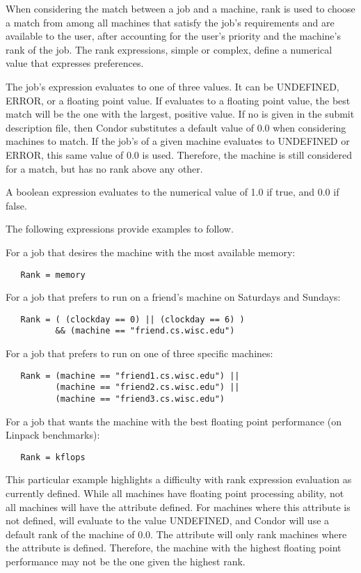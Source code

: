 When considering the match between a job and a machine, rank is used
to choose a match from among all machines that satisfy the job's
requirements and are available to the user, after accounting for
the user's priority and the machine's rank of the job.
The rank expressions, simple or complex, define a numerical value
that expresses preferences.

The job's  expression evaluates to one of three values.
It can be UNDEFINED, ERROR, or a floating point value.
If  evaluates to a floating point value,
the best match will be the one with the largest, positive value.
If no  is given 
in the submit description file,
then Condor substitutes a default value of 0.0 when considering
machines to match.
If the job's  of a given machine evaluates
to UNDEFINED or ERROR,
this same value of 0.0 is used.
Therefore, the machine is still considered for a match,
but has no rank above any other.

A boolean expression evaluates to the numerical value of 1.0
if true, and 0.0 if false.

The following  expressions provide examples to
follow.

For a job that desires the machine with the most available memory:
\begin{verbatim}
   Rank = memory
\end{verbatim}

For a job that prefers to run on a friend's machine
on Saturdays and Sundays:
\begin{verbatim}
   Rank = ( (clockday == 0) || (clockday == 6) )
          && (machine == "friend.cs.wisc.edu")
\end{verbatim}

For a job that prefers to run on one of three specific machines:
\begin{verbatim}
   Rank = (machine == "friend1.cs.wisc.edu") ||
          (machine == "friend2.cs.wisc.edu") ||
          (machine == "friend3.cs.wisc.edu")
\end{verbatim}

For a job that wants the machine with the best floating point
performance (on Linpack benchmarks):
\begin{verbatim}
   Rank = kflops
\end{verbatim}
This particular example highlights a difficulty with rank expression
evaluation as currently defined.
While all machines have floating point processing ability,
not all machines will have the  attribute defined.
For machines where this attribute is not defined,
 will evaluate to the value UNDEFINED, and
Condor will use a default rank of the machine of 0.0.
The  attribute will only rank machines where
the attribute is defined.
Therefore, the machine with the highest floating point
performance may not be the one given the highest rank.

